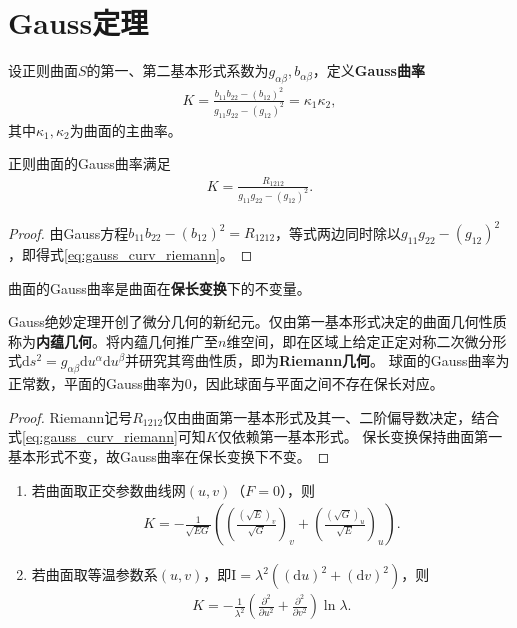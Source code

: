 \documentclass[../../main.tex]{subfiles}%
\begin{document}
\section{Gauss定理}

\begin{definition}
设正则曲面$S$的第一、第二基本形式系数为$g_{\alpha\beta},b_{\alpha\beta}$，定义\textbf{Gauss曲率}
\begin{align*}
K = \frac{b_{11}b_{22}-(b_{12})^2}{g_{11}g_{22}-(g_{12})^2} = \kappa_1\kappa_2,
\end{align*}
其中$\kappa_1,\kappa_2$为曲面的主曲率。
\end{definition}

\begin{proposition}
正则曲面的Gauss曲率满足
\begin{align}
K = \frac{R_{1212}}{g_{11}g_{22}-(g_{12})^2}. \label{eq:gauss_curv_riemann}
\end{align}
\end{proposition}

\begin{proof}
由Gauss方程$b_{11}b_{22}-(b_{12})^2=R_{1212}$，等式两边同时除以$g_{11}g_{22}-(g_{12})^2$，即得式\eqref{eq:gauss_curv_riemann}。
\end{proof}

\begin{theorem}[Gauss绝妙定理]
曲面的Gauss曲率是曲面在\textbf{保长变换}下的不变量。
\end{theorem}
\begin{remark}
Gauss绝妙定理开创了微分几何的新纪元。仅由第一基本形式决定的曲面几何性质称为\textbf{内蕴几何}。将内蕴几何推广至$n$维空间，即在区域上给定正定对称二次微分形式$\mathrm{d}s^2=g_{\alpha\beta}\mathrm{d}u^\alpha\mathrm{d}u^\beta$并研究其弯曲性质，即为\textbf{Riemann几何}。
球面的Gauss曲率为正常数，平面的Gauss曲率为$0$，因此球面与平面之间不存在保长对应。
\end{remark}
\begin{proof}
Riemann记号$R_{1212}$仅由曲面第一基本形式及其一、二阶偏导数决定，结合式\eqref{eq:gauss_curv_riemann}可知$K$仅依赖第一基本形式。
保长变换保持曲面第一基本形式不变，故Gauss曲率在保长变换下不变。
\end{proof}

\begin{proposition}
\begin{enumerate}[(1)]
\item 若曲面取正交参数曲线网$(u,v)$（$F=0$），则
\begin{align}
K = -\frac{1}{\sqrt{EG}}\left(\left(\frac{(\sqrt{E})_v}{\sqrt{G}}\right)_v+\left(\frac{(\sqrt{G})_u}{\sqrt{E}}\right)_u\right). \label{eq:gauss_curv_ortho}
\end{align}
\item 若曲面取等温参数系$(u,v)$，即$\mathrm{I}=\lambda^2\left((\mathrm{d}u)^2+(\mathrm{d}v)^2\right)$，则
\begin{align}
K = -\frac{1}{\lambda^2}\left(\frac{\partial^2}{\partial u^2}+\frac{\partial^2}{\partial v^2}\right)\ln\lambda. \label{eq:gauss_curv_isotherm}
\end{align}
\end{enumerate}
\end{proposition}
\end{document}

